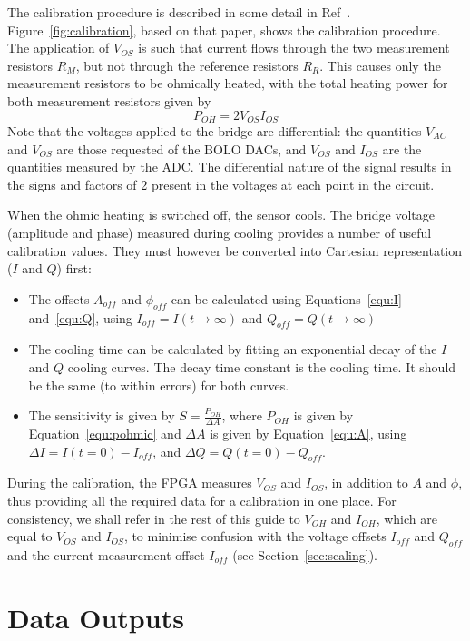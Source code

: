 \documentclass[12pt,a4paper]{article}
\begin{document}
The calibration procedure is described in some detail in Ref~\cite{lovell-2015}. Figure~\ref{fig:calibration}, based on that paper, shows the calibration
procedure. The application of $V_{OS}$ is such that current flows through the two measurement resistors $R_M$, but not through the reference resistors
$R_R$. This causes only the measurement resistors to be ohmically heated, with the total heating power for both measurement resistors given by
\begin{equation}
  \label{equ:pohmic}
  P_{OH} = 2 V_{OS} I_{OS}
\end{equation}
Note that the voltages applied to the bridge are differential: the quantities $V_{AC}$ and $V_{OS}$ are those requested of the BOLO DACs, and $V_{OS}$ and
$I_{OS}$ are the quantities measured by the ADC. The differential nature of the signal results in the signs and factors of 2 present in the voltages at
each point in the circuit.


When the ohmic heating is switched off, the sensor cools. The bridge voltage (amplitude and phase) measured during cooling provides a number of useful
calibration values. They must however be converted into Cartesian representation ($I$ and $Q$) first:
\begin{itemize}
\item{The offsets $A_{off}$ and $\phi_{off}$ can be calculated using Equations~\ref{equ:I} and~\ref{equ:Q}, using $I_{off} = I(t\rightarrow\infty)$ and
    $Q_{off} = Q(t\rightarrow\infty)$}
\item{The cooling time can be calculated by fitting an exponential decay of the $I$ and $Q$ cooling curves. The decay time constant is the cooling time.
    It should be the same (to within errors) for both curves.}
\item{The sensitivity is given by $S = \frac{P_{OH}}{\Delta A}$, where $P_{OH}$ is given by Equation~\ref{equ:pohmic} and $\Delta A$ is given by
    Equation~\ref{equ:A}, using $\Delta I = I(t=0) - I_{off}$, and $\Delta Q = Q(t=0) - Q_{off}$.}
\end{itemize}
During the calibration, the FPGA measures $V_{OS}$ and $I_{OS}$, in addition to $A$ and $\phi$, thus providing all the required data for a
calibration in one place. For consistency, we shall refer in the rest of this guide to $V_{OH}$ and $I_{OH}$, which are equal to $V_{OS}$ and
$I_{OS}$, to minimise confusion with the voltage offsets $I_{off}$ and $Q_{off}$ and the current measurement offset $I_{off}$ (see
Section~\ref{sec:scaling}).

\section{Data Outputs}
\label{sec:outputs}
\end{document}
